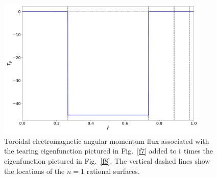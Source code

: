 \documentclass[12pt,prb,aps]{revtex4-1}
\begin{document}
\begin{figure}
\centerline{\includegraphics[width=0.9\textwidth]{Figure9.pdf}}
\caption{Toroidal electromagnetic  angular momentum flux associated with the tearing eigenfunction
pictured in Fig.~\ref{f7} added to ${\rm i}$ times the eigenfunction pictured in Fig.~\ref{f8}.  The vertical dashed lines show
the locations of the $n=1$ rational surfaces.  }\label{f9}
\end{figure}
\fi
\end{document}
